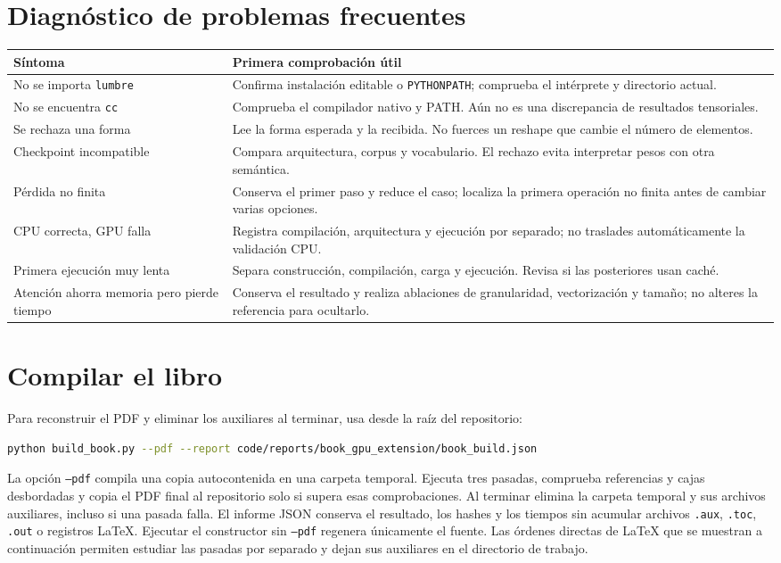 \documentclass[12pt,a4paper,oneside]{report}
\begin{document}
\section{Diagnóstico de problemas frecuentes}
\begin{longtable}{@{}P{.3\textwidth}P{.64\textwidth}@{}}
\toprule\textbf{Síntoma} & \textbf{Primera comprobación útil}\\\midrule\endhead
No se importa \texttt{lumbre} & Confirma instalación editable o \texttt{PYTHONPATH}; comprueba el intérprete y directorio actual.\\
No se encuentra \texttt{cc} & Comprueba el compilador nativo y PATH. Aún no es una discrepancia de resultados tensoriales.\\
Se rechaza una forma & Lee la forma esperada y la recibida. No fuerces un reshape que cambie el número de elementos.\\
Checkpoint incompatible & Compara arquitectura, corpus y vocabulario. El rechazo evita interpretar pesos con otra semántica.\\
Pérdida no finita & Conserva el primer paso y reduce el caso; localiza la primera operación no finita antes de cambiar varias opciones.\\
CPU correcta, GPU falla & Registra compilación, arquitectura y ejecución por separado; no traslades automáticamente la validación CPU.\\
Primera ejecución muy lenta & Separa construcción, compilación, carga y ejecución. Revisa si las posteriores usan caché.\\
Atención ahorra memoria pero pierde tiempo & Conserva el resultado y realiza ablaciones de granularidad, vectorización y tamaño; no alteres la referencia para ocultarlo.\\
\bottomrule\end{longtable}

\section{Compilar el libro}
Para reconstruir el PDF y eliminar los auxiliares al terminar, usa desde la raíz del repositorio:

\begin{lstlisting}[language=bash]
python build_book.py --pdf --report code/reports/book_gpu_extension/book_build.json
\end{lstlisting}

La opción \texttt{--pdf} compila una copia autocontenida en una carpeta temporal. Ejecuta tres pasadas, comprueba referencias y cajas desbordadas y copia el PDF final al repositorio solo si supera esas comprobaciones. Al terminar elimina la carpeta temporal y sus archivos auxiliares, incluso si una pasada falla. El informe JSON conserva el resultado, los hashes y los tiempos sin acumular archivos \texttt{.aux}, \texttt{.toc}, \texttt{.out} o registros LaTeX. Ejecutar el constructor sin \texttt{--pdf} regenera únicamente el fuente. Las órdenes directas de LaTeX que se muestran a continuación permiten estudiar las pasadas por separado y dejan sus auxiliares en el directorio de trabajo.
\end{document}
